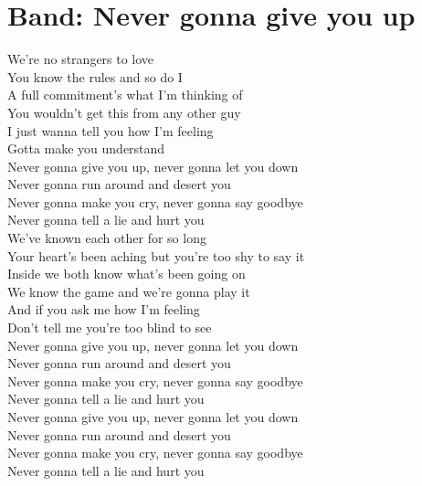 \newpage
\section{Band: Never gonna give you up}
\label{sec:band_never}
\charaktere{\Chor \Sing}


\begin{verseplay}[10em]
\s{\Sing}
We're no strangers to love\\
You know the rules and so do I\\
A full commitment's what I'm thinking of\\
You wouldn't get this from any other guy\\

I just wanna tell you how I'm feeling\\
Gotta make you understand\\

Never gonna give you up, never gonna let you down\\
Never gonna run around and desert you\\
Never gonna make you cry, never gonna say goodbye\\
Never gonna tell a lie and hurt you\\

We've known each other for so long\\
Your heart's been aching but you're too shy to say it\\
Inside we both know what's been going on\\
We know the game and we're gonna play it\\

And if you ask me how I'm feeling\\
Don't tell me you're too blind to see\\

Never gonna give you up, never gonna let you down\\
Never gonna run around and desert you\\
Never gonna make you cry, never gonna say goodbye\\
Never gonna tell a lie and hurt you\\

Never gonna give you up, never gonna let you down\\
Never gonna run around and desert you\\
Never gonna make you cry, never gonna say goodbye\\
Never gonna tell a lie and hurt you\\


\end{verseplay}
